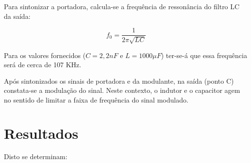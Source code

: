 \documentclass[]{report}
\begin{document}
Para sintonizar a portadora, calcula-se a frequência de ressonância do filtro LC da saída:

\begin{equation}
f_0 = \frac{1}{2 \pi \sqrt{LC}}
\end{equation}

Para os valores fornecidos ($C = 2,2 nF$ e $L = 1000 \mu F$) ter-se-á que essa frequência será de cerca de 107 KHz. 

Após sintonizados os sinais de portadora e da modulante, na saída (ponto C) constata-se a modulação do sinal. Neste contexto, o indutor e o capacitor agem no sentido de limitar a faixa de frequência do sinal modulado.

\section{Resultados}
Disto se determinam:
\end{document}
